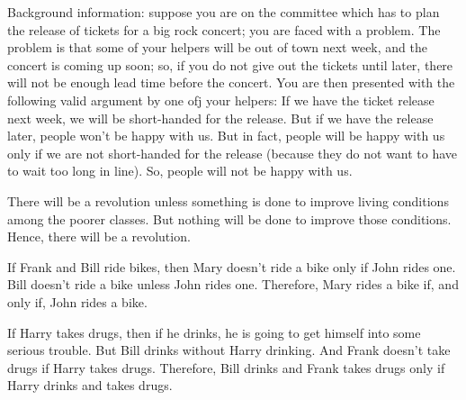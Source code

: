 \begin{enumerate}
	\begin{statement} {Background information: suppose you are on the committee
			which has to plan the release of tickets for a big rock concert; you are
			faced with a problem. The problem is that some of your helpers will be out
			of town next week, and the concert is coming up soon; so, if you do not give
			out the tickets until later, there will not be enough lead time before the
			concert. You are then presented with the following valid argument by one ofj
			your helpers: If we have the ticket release next week, we will be
			short-handed for the release. But if we have the release later, people won't
			be happy with us. But in fact, people will be happy with us only if we are
			not short-handed for the release (because they do not want to have to wait
			too long in line). So, people will not be happy with us.}
	\end{statement}

	\begin{statement}{There will be a revolution unless something is done to improve
			living conditions among the poorer classes. But nothing will be done to
			improve those conditions. Hence, there will be a revolution.}
	\end{statement}

	\begin{statement}{If Frank and Bill ride bikes, then Mary doesn't ride a bike
			only if John rides one. Bill doesn't ride a bike unless John rides one.
			Therefore, Mary rides a bike if, and only if, John rides a bike.}
	\end{statement}

	\begin{statement}{ If Harry takes drugs, then if he drinks, he is going to get
			himself into some serious trouble. But Bill drinks without Harry drinking.
			And Frank doesn't take drugs if Harry takes drugs. Therefore, Bill drinks
			and Frank takes drugs only if Harry drinks and takes drugs.}
	\end{statement}


\end{enumerate}
